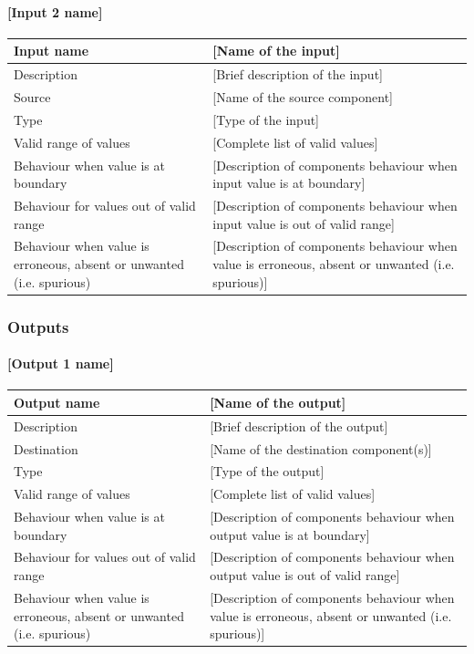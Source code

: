 \paragraph{[Input 2 name]}

\begin{longtable}{p{}p{}}
\toprule
Input name				& [Name of the input] \\
\midrule
Description				& [Brief description of the input] \\
\midrule
Source					& [Name of the source component] \\ 
\midrule
Type					& [Type of the input] \\
\midrule
Valid range of values	& [Complete list of valid values] \\
\midrule
Behaviour when value is at boundary	& [Description of components behaviour when input value is at boundary] \\
\midrule
Behaviour for values out of valid range	& [Description of components behaviour when input value is out of valid range] \\
\midrule
Behaviour when value is erroneous, absent or unwanted (i.e. spurious) & [Description of components behaviour when value is erroneous, absent or unwanted (i.e. spurious)] \\
\bottomrule
\end{longtable}


\subsubsection{Outputs}\label{s:ManageDMIInput_outputs}

\paragraph{[Output 1 name]}

\begin{longtable}{p{}p{}}
\toprule
Output name				& [Name of the output] \\
\midrule
Description				& [Brief description of the output] \\
\midrule
Destination				& [Name of the destination component(s)] \\ 
\midrule
Type					& [Type of the output] \\
\midrule
Valid range of values	& [Complete list of valid values] \\
\midrule
Behaviour when value is at boundary	& [Description of components behaviour when output value is at boundary] \\
\midrule
Behaviour for values out of valid range	& [Description of components behaviour when output value is out of valid range] \\
\midrule
Behaviour when value is erroneous, absent or unwanted (i.e. spurious) & [Description of components behaviour when value is erroneous, absent or unwanted (i.e. spurious)] \\
\bottomrule
\end{longtable}



